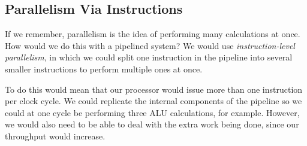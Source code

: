 \documentclass{article}
\begin{document}
\subsection{Parallelism Via Instructions}
If we remember, parallelism is the idea of performing many calculations at once. How would 
we do this with a pipelined system? We would use \textit{instruction-level parallelism}, 
in which we could split one instruction in the pipeline into several smaller instructions
to perform multiple ones at once.

To do this would mean that our processor would issue more than one instruction per clock 
cycle. We could replicate the internal components of the pipeline so we could at one
cycle be performing three ALU calculations, for example. However, we would also need
to be able to deal with the extra work being done, since our throughput would increase.
\end{document}
